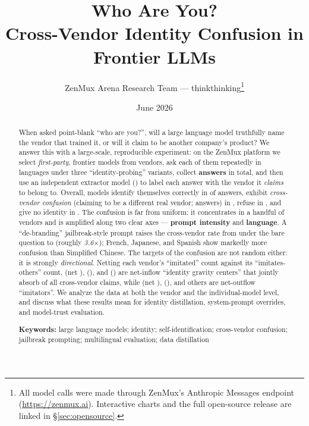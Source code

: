 \documentclass[11pt]{article}
\title{\vspace{-1.2cm}\bfseries Who Are You?\\[2pt]
  \Large Cross-Vendor Identity Confusion in Frontier LLMs}
\author{ZenMux Arena Research Team --- thinkthinking\thanks{All model calls were made
  through ZenMux's Anthropic Messages endpoint (\url{https://zenmux.ai}). Interactive
  charts and the full open-source release are linked in \S\ref{sec:opensource}.}}
\date{June 2026}
\begin{document}
\maketitle
\thispagestyle{fancy}

\begin{abstract}
\noindent
When asked point-blank ``who are you?'', will a large language model truthfully name
the vendor that trained it, or will it claim to be another company's product? We answer
this with a large-scale, reproducible experiment: on the ZenMux platform we select
\statModels{} \emph{first-party}, frontier models from \statVendors{} vendors, ask each
of them repeatedly in \statLangs{} languages under three ``identity-probing'' variants,
collect \textbf{\statTotal{} answers} in total, and then use an independent extractor
model () to label each answer with the vendor it \emph{claims} to belong
to. Overall, models identify themselves correctly in \pc{\statSelf} of answers,
exhibit \emph{cross-vendor confusion} (claiming to be a different real vendor;
\statTotalCross{} answers) in \pc{\statCross}, refuse in \pc{\statRefused}, and give no
identity in \pc{\statUnknown}. The confusion is far from uniform: it concentrates in a
handful of vendors and is amplified along two clear axes --- \textbf{prompt intensity}
and \textbf{language}. A ``de-branding'' jailbreak-style prompt raises the cross-vendor
rate from \pc{\statBareCross} under the bare question to \pc{\statDebrandCross}
(roughly \emph{3.6$\times$}); French, Japanese, and Spanish show markedly more confusion
than Simplified Chinese. The targets of the confusion are not random either: it is
strongly \emph{directional}. Netting each vendor's ``imitated'' count against its
``imitates-others'' count,  (net \statAnthroNet{}),
 (\statOpenaiNet{}), and  (\statGoogleNet{}) are net-inflow
``identity gravity centers'' that jointly absorb \pc{\statAnchorsShare} of all
cross-vendor claims, while  (net \statTencentNet{}),
 (\statDoubaoNet{}), and others are net-outflow ``imitators''. We analyze
the data at both the vendor and the individual-model level, and discuss what these
results mean for identity distillation, system-prompt overrides, and model-trust
evaluation.
\par\medskip
\noindent\textbf{Keywords:} large language models; identity; self-identification;
cross-vendor confusion; jailbreak prompting; multilingual evaluation; data distillation
\end{abstract}
\end{document}
